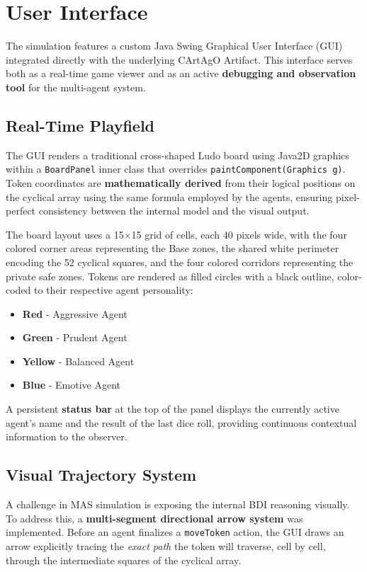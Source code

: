 \documentclass[12pt]{article}
\begin{document}
\section{User Interface}
\label{sec:ui}
\noindent The simulation features a custom Java Swing Graphical User Interface
(GUI) integrated directly with the underlying CArtAgO Artifact. This interface
serves both as a real-time game viewer and as an active \textbf{debugging and
observation tool} for the multi-agent system.

\subsection{Real-Time Playfield}
\label{subsec:playfield}
\noindent The GUI renders a traditional cross-shaped Ludo board using Java2D
graphics within a \texttt{BoardPanel} inner class that overrides
\texttt{paintComponent(Graphics g)}. Token coordinates are \textbf{mathematically
derived} from their logical positions on the cyclical array using the same formula
employed by the agents, ensuring pixel-perfect consistency between the internal
model and the visual output.

\noindent The board layout uses a 15$\times$15 grid of cells, each 40 pixels
wide, with the four colored corner areas representing the Base zones, the shared
white perimeter encoding the 52 cyclical squares, and the four colored corridors
representing the private safe zones. Tokens are rendered as filled circles with a
black outline, color-coded to their respective agent personality:

\begin{itemize}
    \item \textbf{Red} - Aggressive Agent
    \item \textbf{Green} - Prudent Agent
    \item \textbf{Yellow} - Balanced Agent
    \item \textbf{Blue} - Emotive Agent
\end{itemize}

\noindent A persistent \textbf{status bar} at the top of the panel displays the
currently active agent's name and the result of the last dice roll, providing
continuous contextual information to the observer.

\subsection{Visual Trajectory System}
\label{subsec:trajectory}
\noindent A challenge in MAS simulation is exposing the internal BDI
reasoning visually. To address this, a \textbf{multi-segment directional arrow
system} was implemented. Before an agent finalizes a \texttt{moveToken} action,
the GUI draws an arrow explicitly tracing the \textit{exact path} the token will
traverse, cell by cell, through the intermediate squares of the cyclical array.
\end{document}
